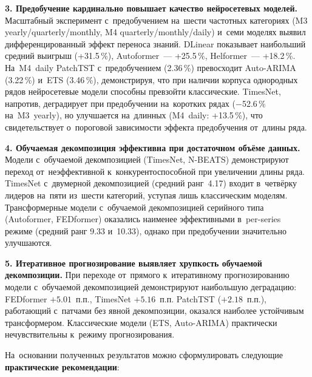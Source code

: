 \textbf{3. Предобучение кардинально повышает качество нейросетевых
моделей.} Масштабный эксперимент с~предобучением на~шести частотных
категориях (M3 yearly/quarterly/monthly, M4 quarterly/monthly/daily)
и~семи моделях выявил дифференцированный эффект переноса знаний.
DLinear показывает наибольший средний выигрыш (+31.5\,\%),
Autoformer~--- +25.5\,\%, Helformer~--- +18.2\,\%.
На~M4~daily PatchTST с~предобучением (2.36\,\%) превосходит
Auto-ARIMA (3.22\,\%) и~ETS (3.46\,\%), демонстрируя, что при
наличии корпуса однородных рядов нейросетевые модели способны
превзойти классические. TimesNet, напротив, деградирует при
предобучении на~коротких рядах ($-$52.6\,\% на~M3~yearly),
но улучшается на~длинных (M4~daily: +13.5\,\%), что свидетельствует
о~пороговой зависимости эффекта предобучения от~длины ряда.

\textbf{4. Обучаемая декомпозиция эффективна при достаточном
объёме данных.} Модели с~обучаемой декомпозицией (TimesNet, N-BEATS)
демонстрируют переход от~неэффективной к~конкурентоспособной
при увеличении длины ряда. TimesNet с~двумерной декомпозицией
(средний ранг~4.17) входит в~четвёрку лидеров на~пяти из~шести
категорий, уступая лишь классическим моделям. Трансформерные
модели с~обучаемой декомпозицией серийного типа (Autoformer,
FEDformer) оказались наименее эффективными в~per-series режиме
(средний ранг 9.33 и~10.33), однако при предобучении значительно
улучшаются.

\textbf{5. Итеративное прогнозирование выявляет хрупкость обучаемой
декомпозиции.} При переходе от~прямого к~итеративному
прогнозированию модели с~обучаемой декомпозицией демонстрируют
наибольшую деградацию: FEDformer $+5.01$~п.п., TimesNet
$+5.16$~п.п. PatchTST ($+2.18$~п.п.), работающий с~патчами
без явной декомпозиции, оказался наиболее устойчивым трансформером.
Классические модели (ETS, Auto-ARIMA) практически нечувствительны
к~режиму прогнозирования.

На~основании полученных результатов можно сформулировать следующие
\textbf{практические рекомендации}:

